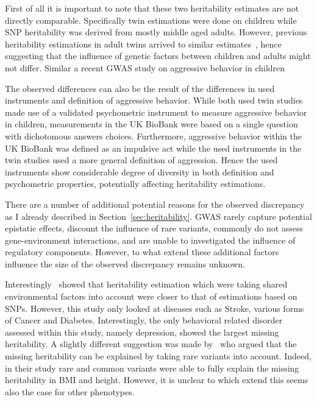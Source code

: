 First of all it is important to note that these two heritability estimates are not directly comparable.
Specifically twin estimations were done on children while SNP heritability was derived from mostly middle aged adults.
However, previous heritability estimations in adult twins arrived to similar estimates~\cite{Miles1997a}, hence suggesting that the influence of genetic factors between children and adults might not differ.
Similar a recent GWAS study on aggressive behavior in children %

The observed differences can also be the result of the differences in used instruments and definition of aggressive behavior.
While both used twin studies made use of a validated psychometric instrument to measure aggressive behavior in children, measurements in the UK BioBank were based on a single question with dichotomous answers choices.
Furthermore, aggressive behavior within the UK BioBank was defined as an impulsive act while the used instruments in the twin studies used a more general definition of aggression.
Hence the used instruments show considerable degree of diversity in both definition and psychometric properties, potentially affecting heritability estimations.

There are a number of additional potential reasons for the observed discrepancy as I already described in Section~\ref{sec:heritability}.
GWAS rarely capture potential epistatic effects, discount the influence of rare variants, commonly do not assess gene-environment interactions, and are unable to investigated the influence of regulatory components. 
However, to what extend these additional factors influence the size of the observed discrepancy remains unknown.

Interestingly~\citet{Munoz2016a} showed that heritability estimation which were taking shared environmental factors into account were closer to that of estimations based on SNPs.
However, this study only looked at diseases such as Stroke, various forms of Cancer and Diabetes.
Interestingly, the only behavioral related disorder assessed within this study, namely depression, showed the largest missing heritability.
A slightly different suggestion was made by~\citet{Yang2015} who argued that the missing heritability can be explained by taking rare variants into account.
Indeed, in their study rare and common variants were able to fully explain the missing heritability in BMI and height.
However, it is unclear to which extend this seems also the case for other phenotypes.

